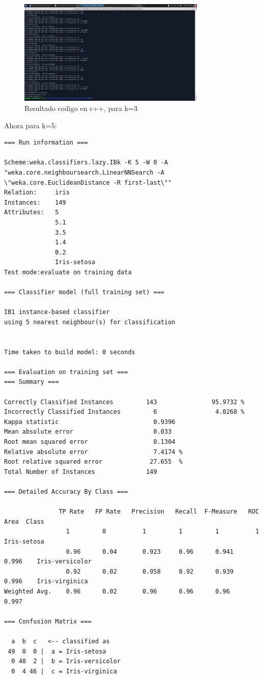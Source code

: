 \documentclass[12pt,letterpaper]{article}
\begin{document}
\begin{figure}[H]
    \centering
    \includegraphics[width=0.8\textwidth]{knnc++3.jpg}
    \caption{Resultado codigo en c++, para k=3}
    \label{fig:3}
\end{figure}

Ahora para k=5:

\begin{lstlisting}
=== Run information ===

Scheme:weka.classifiers.lazy.IBk -K 5 -W 0 -A "weka.core.neighboursearch.LinearNNSearch -A \"weka.core.EuclideanDistance -R first-last\""
Relation:     iris
Instances:    149
Attributes:   5
              5.1
              3.5
              1.4
              0.2
              Iris-setosa
Test mode:evaluate on training data

=== Classifier model (full training set) ===

IB1 instance-based classifier
using 5 nearest neighbour(s) for classification


Time taken to build model: 0 seconds

=== Evaluation on training set ===
=== Summary ===

Correctly Classified Instances         143               95.9732 %
Incorrectly Classified Instances         6                4.0268 %
Kappa statistic                          0.9396
Mean absolute error                      0.033 
Root mean squared error                  0.1304
Relative absolute error                  7.4174 %
Root relative squared error             27.655  %
Total Number of Instances              149     

=== Detailed Accuracy By Class ===

               TP Rate   FP Rate   Precision   Recall  F-Measure   ROC Area  Class
                 1         0          1         1         1          1        Iris-setosa
                 0.96      0.04       0.923     0.96      0.941      0.996    Iris-versicolor
                 0.92      0.02       0.958     0.92      0.939      0.996    Iris-virginica
Weighted Avg.    0.96      0.02       0.96      0.96      0.96       0.997

=== Confusion Matrix ===

  a  b  c   <-- classified as
 49  0  0 |  a = Iris-setosa
  0 48  2 |  b = Iris-versicolor
  0  4 46 |  c = Iris-virginica
\end{lstlisting}
\end{document}
